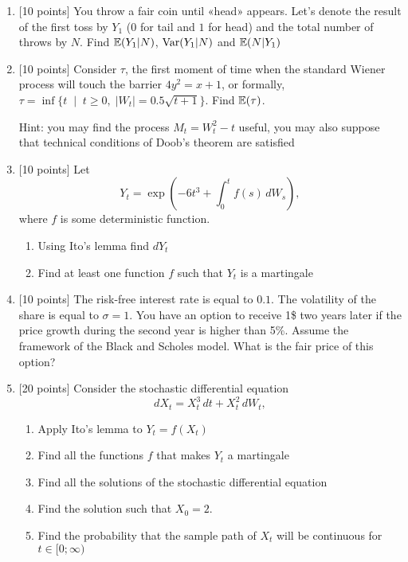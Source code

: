 \documentclass[12pt, a4paper]{article}
\begin{document}
\begin{enumerate}


\item $[$10 points] You throw a fair coin until «head» appears. Let's denote the result of the first toss by $Y_1$ ($0$ for tail and $1$ for head) and the total number of throws by $N$. Find $\mathbb{E}(Y_1|N)$, $\operatorname{Var}(Y_1|N)$ and $\mathbb{E}(N|Y_1)$

\item $[$10 points] Consider $\tau$, the first moment of time when the standard Wiener process will touch the barrier $4y^2=x+1$, or formally, $\tau = \inf\{t \; \mid \; t \geq 0, \; |W_t|= 0.5 \sqrt{t+1} \}$. Find $\mathbb{E}(\tau)$.

Hint: you may find the process $M_t=W_t^2 - t$ useful, you may also suppose that technical conditions of Doob's theorem are satisfied


\item $[$10 points] Let
\[
Y_t = \exp \left(-6t^3 + \int_0^t f(s)\, dW_s \right),
\]
where $f$ is some deterministic function.

\begin{enumerate}
\item Using Ito's lemma find $dY_t$
\item Find at least one function $f$ such that $Y_t$ is a martingale
\end{enumerate}

\item $[$10 points] The risk-free interest rate is equal to $0.1$. The volatility of the share is equal to $\sigma=1$. You have an option to receive 1\$ two years later if the price growth during the second year is higher than 5\%. Assume the framework of the Black and Scholes model. What is the fair price of this option?

\item $[$20 points] Consider the stochastic differential equation
\[
dX_t = X_t^3 \, dt + X_t^2 \, dW_t,
\]

\begin{enumerate}
\item Apply Ito's lemma to $Y_t=f(X_t)$
\item Find all the functions $f$ that makes $Y_t$ a martingale
\item Find all the solutions of the stochastic differential equation
\item Find the solution such that $X_0 = 2$.
\item Find the probability that the sample path of $X_t$ will be continuous for $t \in [0; \infty)$
\end{enumerate}

\end{enumerate}
\end{document}
